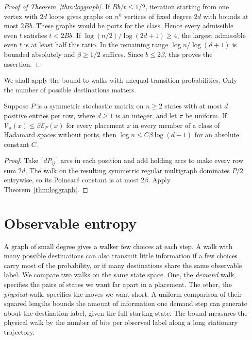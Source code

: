 \begin{proof}[Proof of Theorem~\ref{thm:loggraph}]
If \(Bb/t\le1/2\), iteration starting from one vertex with \(2d\)
loops gives graphs on \(n^k\) vertices of fixed degree \(2d\) with
bounds at most \(2Bb\). These graphs would be ports for the class.
Hence every admissible even \(t\) satisfies \(t<2Bb\). If
\(\log(n/2)/\log(2d+1)\ge4\), the largest admissible even \(t\)
is at least half this ratio. In the remaining range
\(\log n/\log(d+1)\) is bounded absolutely and \(\beta\ge1/2\)
suffices. Since \(b\le2\beta\), this proves the assertion.
\end{proof}

We shall apply the bound to walks with unequal transition
probabilities. Only the number of possible destinations matters.

\begin{corollary}\label{cor:support}
Suppose \(P\) is a symmetric stochastic matrix on \(n\ge2\) states
with at most \(d\) positive entries per row, where \(d\ge1\) is
an integer, and let \(\pi\) be uniform. If
\(\mathcal V_\pi(x)\le\beta\mathcal E_P(x)\) for every placement \(x\)
in every member of a class of Hadamard spaces without ports, then
\(\log n\le C\beta\log(d+1)\) for an absolute constant \(C\).
\end{corollary}
\begin{proof}
Take \(\lceil dP_{ij}\rceil\) arcs in each position and add holding
arcs to make every row sum \(2d\). The walk on the resulting symmetric
regular multigraph dominates \(P/2\) entrywise, so its Poincaré
constant is at most \(2\beta\). Apply Theorem~\ref{thm:loggraph}.
\end{proof}
\section{Observable entropy}\label{sec:entropy}

A graph of small degree gives a walker few choices at each step.
A walk with many possible destinations can also transmit little
information if a few choices carry most of the probability, or if
many destinations share the same observable label. We compare
two walks on the same state space. One, the \emph{demand} walk,
specifies the pairs of states we want far apart in a placement.
The other, the \emph{physical} walk, specifies the moves we want
short. A uniform comparison of their squared lengths bounds the
amount of information one demand step can generate about the
destination label, given the full starting state. The bound measures
the physical walk by the number of bits per observed label along a
long stationary trajectory.


